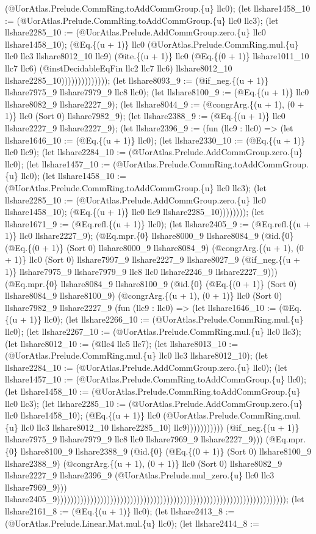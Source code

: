 \documentclass[11pt]{article}
\begin{document}
(@UorAtlas.Prelude.CommRing.toAddCommGroup.\{u\} llc0); (let llshare1458\_10 := (@UorAtlas.Prelude.CommRing.toAddCommGroup.\{u\} llc0 llc3); (let llshare2285\_10 := (@UorAtlas.Prelude.AddCommGroup.zero.\{u\} llc0 llshare1458\_10); (@Eq.\{(u + 1)\} llc0 (@UorAtlas.Prelude.CommRing.mul.\{u\} llc0 llc3 llshare8012\_10 llc9) (@ite.\{(u + 1)\} llc0 (@Eq.\{(0 + 1)\} llshare1011\_10 llc7 llc6) (@instDecidableEqFin llc2 llc7 llc6) llshare8012\_10 llshare2285\_10)))))))))))))); (let llshare8093\_9 := (@if\_neg.\{(u + 1)\} llshare7975\_9 llshare7979\_9 llc8 llc0); (let llshare8100\_9 := (@Eq.\{(u + 1)\} llc0 llshare8082\_9 llshare2227\_9); (let llshare8044\_9 := (@congrArg.\{(u + 1), (0 + 1)\} llc0 (Sort 0) llshare7982\_9); (let llshare2388\_9 := (@Eq.\{(u + 1)\} llc0 llshare2227\_9 llshare2227\_9); (let llshare2396\_9 := (fun (llc9 : llc0) => (let llshare1646\_10 := (@Eq.\{(u + 1)\} llc0); (let llshare2330\_10 := (@Eq.\{(u + 1)\} llc0 llc9); (let llshare2284\_10 := (@UorAtlas.Prelude.AddCommGroup.zero.\{u\} llc0); (let llshare1457\_10 := (@UorAtlas.Prelude.CommRing.toAddCommGroup.\{u\} llc0); (let llshare1458\_10 := (@UorAtlas.Prelude.CommRing.toAddCommGroup.\{u\} llc0 llc3); (let llshare2285\_10 := (@UorAtlas.Prelude.AddCommGroup.zero.\{u\} llc0 llshare1458\_10); (@Eq.\{(u + 1)\} llc0 llc9 llshare2285\_10)))))))); (let llshare1671\_9 := (@Eq.refl.\{(u + 1)\} llc0); (let llshare2405\_9 := (@Eq.refl.\{(u + 1)\} llc0 llshare2227\_9); (@Eq.mpr.\{0\} llshare8000\_9 llshare8084\_9 (@id.\{0\} (@Eq.\{(0 + 1)\} (Sort 0) llshare8000\_9 llshare8084\_9) (@congrArg.\{(u + 1), (0 + 1)\} llc0 (Sort 0) llshare7997\_9 llshare2227\_9 llshare8027\_9 (@if\_neg.\{(u + 1)\} llshare7975\_9 llshare7979\_9 llc8 llc0 llshare2246\_9 llshare2227\_9))) (@Eq.mpr.\{0\} llshare8084\_9 llshare8100\_9 (@id.\{0\} (@Eq.\{(0 + 1)\} (Sort 0) llshare8084\_9 llshare8100\_9) (@congrArg.\{(u + 1), (0 + 1)\} llc0 (Sort 0) llshare7982\_9 llshare2227\_9 (fun (llc9 : llc0) => (let llshare1646\_10 := (@Eq.\{(u + 1)\} llc0); (let llshare2266\_10 := (@UorAtlas.Prelude.CommRing.mul.\{u\} llc0); (let llshare2267\_10 := (@UorAtlas.Prelude.CommRing.mul.\{u\} llc0 llc3); (let llshare8012\_10 := (@llc4 llc5 llc7); (let llshare8013\_10 := (@UorAtlas.Prelude.CommRing.mul.\{u\} llc0 llc3 llshare8012\_10); (let llshare2284\_10 := (@UorAtlas.Prelude.AddCommGroup.zero.\{u\} llc0); (let llshare1457\_10 := (@UorAtlas.Prelude.CommRing.toAddCommGroup.\{u\} llc0); (let llshare1458\_10 := (@UorAtlas.Prelude.CommRing.toAddCommGroup.\{u\} llc0 llc3); (let llshare2285\_10 := (@UorAtlas.Prelude.AddCommGroup.zero.\{u\} llc0 llshare1458\_10); (@Eq.\{(u + 1)\} llc0 (@UorAtlas.Prelude.CommRing.mul.\{u\} llc0 llc3 llshare8012\_10 llshare2285\_10) llc9))))))))))) (@if\_neg.\{(u + 1)\} llshare7975\_9 llshare7979\_9 llc8 llc0 llshare7969\_9 llshare2227\_9))) (@Eq.mpr.\{0\} llshare8100\_9 llshare2388\_9 (@id.\{0\} (@Eq.\{(0 + 1)\} (Sort 0) llshare8100\_9 llshare2388\_9) (@congrArg.\{(u + 1), (0 + 1)\} llc0 (Sort 0) llshare8082\_9 llshare2227\_9 llshare2396\_9 (@UorAtlas.Prelude.mul\_zero.\{u\} llc0 llc3 llshare7969\_9))) llshare2405\_9))))))))))))))))))))))))))))))))))))))))))))))))))))))))))))))))))))); (let llshare2161\_8 := (@Eq.\{(u + 1)\} llc0); (let llshare2413\_8 := (@UorAtlas.Prelude.Linear.Mat.mul.\{u\} llc0); (let llshare2414\_8 := 
\end{document}
